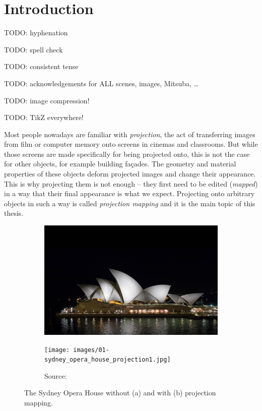 \chapter{Introduction}
\label{chapter:intro}

{\color{red} TODO: hyphenation}

{\color{red} TODO: spell check}

{\color{red} TODO: consistent tense}

{\color{red} TODO: acknowledgements for ALL scenes, images, Mitsuba, \dots}

{\color{red} TODO: image compression!}

{\color{red} TODO: TikZ everywhere!}

Most people nowadays are familiar with \textit{projection}, the act of transferring images from film or computer memory onto screens in cinemas and classrooms. But while those screens are made specifically for being projected onto, this is not the case for other objects, for example building façades. The geometry and material properties of these objects deform projected images and change their appearance. This is why projecting them is not enough -- they first need to be edited (\textit{mapped}) in a way that their final appearance is what we expect. Projecting onto arbitrary objects in such a way is called \textit{projection mapping} and it is the main topic of this thesis.

\begin{figure}[ht]
    \centering
    \begin{subfigure}[b]{0.49\textwidth}
        \centering
        \includegraphics[width=\textwidth]{images/01-sydney_opera_house_night-edit.jpg}
        \caption{}
    \end{subfigure}
    \hfill
    \begin{subfigure}[b]{0.49\textwidth}
        \centering
        \texttt{[image: images/01-sydney\_opera\_house\_projection1.jpg]}
        \caption{Source: \citet{ImageProjectionMappingExampleSydney}}
    \end{subfigure}
    \caption{The Sydney Opera House without (a) and with (b) projection mapping.}
    \label{fig:intro_example_sydney}
\end{figure}

